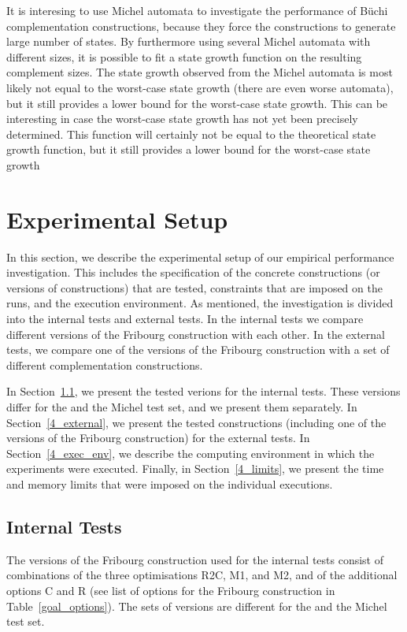 It is interesing to use Michel automata to investigate the performance of Büchi complementation constructions, because they force the constructions to generate large number of states. By furthermore using several Michel automata with different sizes, it is possible to fit a state growth function on the resulting complement sizes. The state growth observed from the Michel automata is most likely not equal to the worst-case state growth (there are even worse automata), but it still provides a lower bound for the worst-case state growth. This can be interesting in case the worst-case state growth has not yet been precisely determined.  This function will certainly not be equal to the theoretical state growth function, but it still provides a lower bound for the worst-case state growth


\section{Experimental Setup}
\label{4_exp_setup}
In this section, we describe the experimental setup of our empirical performance investigation. This includes the specification of the concrete constructions (or versions of constructions) that are tested, constraints that are imposed on the runs, and the execution environment. As mentioned, the investigation is divided into the internal tests and external tests. In the internal tests we compare different versions of the Fribourg construction with each other. In the external tests, we compare one of the versions of the Fribourg construction with a set of different complementation constructions.

In Section~\ref{4_internal}, we present the tested verions for the internal tests. These versions differ for the \goal and the Michel test set, and we present them separately. In Section~\ref{4_external}, we present the tested constructions (including one of the versions of the Fribourg construction) for the external tests. In Section~\ref{4_exec_env}, we describe the computing environment in which the experiments were executed. Finally, in Section~\ref{4_limits}, we present the time and memory limits that were imposed on the individual executions. 

\subsection{Internal Tests}
\label{4_internal}
The versions of the Fribourg construction used for the internal tests consist of combinations of the three optimisations R2C, M1, and M2, and of the additional options C and R (see list of options for the Fribourg construction in Table~\ref{goal_options}). The sets of versions are different for the \goal{} and the Michel test set.

